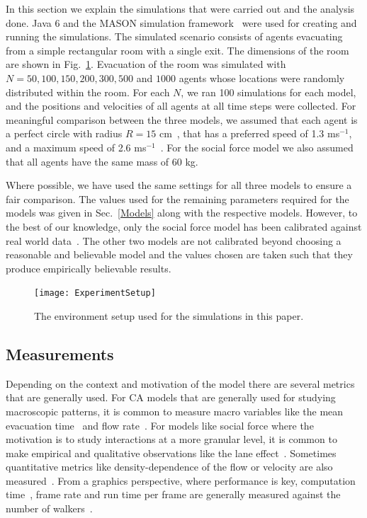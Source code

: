 In this section we explain the simulations that were carried out and the analysis done. Java 6 and the MASON simulation framework~\cite{Luke:2005wc} were used for creating and running the simulations. The simulated scenario consists of agents evacuating from a simple rectangular room with a single exit. The dimensions of the room are shown in Fig.~\ref{fig:experimentalSetup}. Evacuation of the room was simulated with $N = 50, 100, 150, 200, 300, 500$ and $1000$ agents whose locations were randomly distributed within the room. For each $N$, we ran 100 simulations for each model, and the positions and velocities of all agents at all time steps were collected. For meaningful comparison between the three models, we assumed that each agent is a perfect circle with radius $R = 15$ cm~\cite{Pan:2006vp}, that has a preferred speed of 1.3 ms$^{-1}$, and a maximum speed of 2.6 ms$^{-1}$~\cite{fruin1992designing}. For the social force model we also assumed that all agents have the same mass of 60 kg.

Where possible, we have used the same settings for all three models to ensure a fair comparison. The values used for the remaining parameters required for the models was given in Sec.~\ref{Models} along with the respective models. However, to the best of our knowledge, only the social force model has been calibrated against real world data~\cite{Bauer2011}. The other two models are not calibrated beyond choosing a reasonable and believable model and the values chosen are taken such that they produce empirically believable results.


\begin{figure}[htbp]
\centering
\texttt{[image: ExperimentSetup]}
\caption{The environment setup used for the simulations in this paper.}
\label{fig:experimentalSetup}
\end{figure}

\subsection{Measurements}

Depending on the context and motivation of the model there are several metrics that are generally used. For CA models that are generally used for studying macroscopic patterns, it is common to measure macro variables like the mean evacuation time~\cite{Nagai:2004kl} and flow rate~\cite{Tajima:2001to}. For models like social force where the motivation is to study interactions at a more granular level, it is common to make empirical and qualitative observations like the lane effect~\cite{PhysRevE.51.4282}. Sometimes quantitative metrics like density-dependence of the flow or velocity are also measured~\cite{Seyfried2008}. From a graphics perspective, where performance is key, computation time~\cite{Ondrej:2010hv}, frame rate and run time per frame are generally measured against the number of walkers~\cite{vandenBerg:2008fu}.


